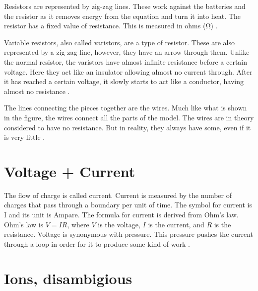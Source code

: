 \documentclass[Orator]{subfiles}
\begin{document}
Resistors are represented by zig-zag lines. These work against the batteries and the resistor as it removes energy from the equation and turn it into heat. The resistor has a fixed value of resistance. This is measured in ohms (\unit{\ohm}) \cite{}.

Variable resistors, also called varistors, are a type of resistor. These are also represented by a zig-zag line, however, they have an arrow through them. Unlike the normal resistor, the varistors have almost infinite resistance before a certain voltage. Here they act like an insulator allowing almost no current through. After it has reached a certain voltage, it slowly starts to act like a conductor, having almost no resistance \cite{}. 

The lines connecting the pieces together are the wires. Much like what is shown in the figure, the wires connect all the parts of the model. The wires are in theory considered to have no resistance. But in reality, they always have some, even if it is very little \cite{}. 


\section{Voltage + Current}
The flow of charge is called current. Current is measured by the number of charges that pass through a boundary per unit of time. The symbol for current is I and its unit is Ampare. The formula for current is derived from Ohm's law. Ohm's law is \(V=IR\), where \(V\) is the voltage, \(I\) is the current, and \(R\) is the resistance. Voltage is synonymous with pressure. This pressure pushes the current through a loop in order for it to produce some kind of work \cite{}. 


\section{Ions, disambigious}
\end{document}
